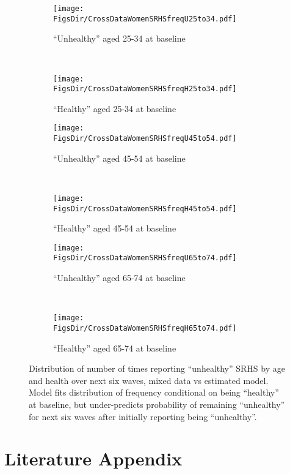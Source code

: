 \documentclass[12pt,pdftex,letterpaper]{article}
\newcommand{\RootDir}{..}
\newcommand{\FigsDir}{\RootDir/Figures}
\begin{document}
\newpage


\begin{figure}[H]
	\centering
	\begin{subfigure}[b]{0.48\textwidth}
		\texttt{[image: \\FigsDir/CrossDataWomenSRHSfreqU25to34.pdf]}
		\caption{``Unhealthy'' aged 25-34 at baseline}\label{fig:SRHSfreqU25to34}
	\end{subfigure}
	~
	\begin{subfigure}[b]{0.48\textwidth}
		\texttt{[image: \\FigsDir/CrossDataWomenSRHSfreqH25to34.pdf]}
		\caption{``Healthy'' aged 25-34 at baseline}\label{fig:SRHSfreqH25to34}
	\end{subfigure}

    \begin{subfigure}[b]{0.48\textwidth}
	    \texttt{[image: \\FigsDir/CrossDataWomenSRHSfreqU45to54.pdf]}
	    \caption{``Unhealthy'' aged 45-54 at baseline}\label{fig:SRHSfreqU45to54}
    \end{subfigure}
    ~
    \begin{subfigure}[b]{0.48\textwidth}
    	\texttt{[image: \\FigsDir/CrossDataWomenSRHSfreqH45to54.pdf]}
    	\caption{``Healthy'' aged 45-54 at baseline}\label{fig:SRHSfreqH45to54}
    \end{subfigure}


    \begin{subfigure}[b]{0.48\textwidth}
    	\texttt{[image: \\FigsDir/CrossDataWomenSRHSfreqU65to74.pdf]}
    	\caption{``Unhealthy'' aged 65-74 at baseline}\label{fig:SRHSfreqU65to74}
    \end{subfigure}
    ~
    \begin{subfigure}[b]{0.48\textwidth}
    	\texttt{[image: \\FigsDir/CrossDataWomenSRHSfreqH65to74.pdf]}
    	\caption{``Healthy'' aged 65-74 at baseline}\label{fig:SRHSfreqH65to74}
    \end{subfigure}
    \caption{Distribution of number of times reporting ``unhealthy'' SRHS by age and health over next six waves, mixed data vs estimated model.  Model fits distribution of frequency conditional on being ``healthy'' at baseline, but under-predicts probability of remaining ``unhealthy'' for next six waves after initially reporting being ``unhealthy''. }\label{fig:SRHSfreqMixedWomen}
\end{figure}


\newpage

\appendix

\section*{Literature Appendix}\label{app:LitQuotes}
\end{document}
